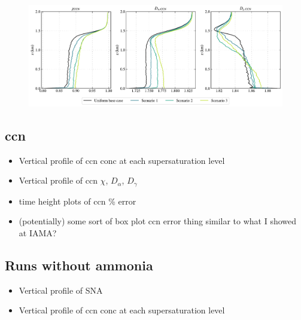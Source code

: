 \begin{figure}[!t]
  \centering
    \includegraphics[width=\textwidth]{figures/chapter5/aerosol-ccn-mixingstate-vertical-profiles-time36.pdf}
    \caption{}
\end{figure}


\subsection{ccn}

\begin{itemize}
\item Vertical profile of ccn conc at each supersaturation level
\item Vertical profile of ccn $\chi$, $D_{\alpha}$, $D_{\gamma}$
\item time height plots of ccn \% error
\item (potentially) some sort of box plot ccn error thing similar to what I showed at IAMA?
\end{itemize}

\subsection{Runs without ammonia}

\begin{itemize}
\item Vertical profile of SNA
\item Vertical profile of ccn conc at each supersaturation level
\end{itemize}


